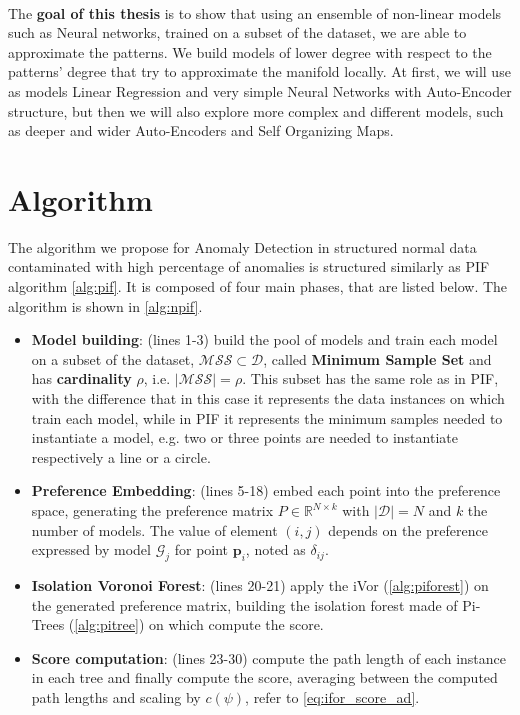 \paragraph{}
The \textbf{goal of this thesis} is to show that using an ensemble of non-linear models such as Neural networks, trained on a subset of the dataset, we are able to approximate the patterns. \newline
We build models of lower degree with respect to the patterns' degree that try to approximate the manifold locally. At first, we will use as models Linear Regression and very simple Neural Networks with Auto-Encoder structure, but then we will also explore more complex and different models, such as deeper and wider Auto-Encoders and Self Organizing Maps.

\section{Algorithm}
\label{sec:algorithm}
The algorithm we propose for Anomaly Detection in structured normal data contaminated with high percentage of anomalies is structured similarly as PIF algorithm \ref{alg:pif}. It is composed of four main phases, that are listed below. The algorithm is shown in \ref{alg:npif}.

\begin{itemize}
    \item \textbf{Model building}: (lines 1-3) build the pool of models and train each model on a subset of the dataset, $\mathcal{MSS} \subset \mathcal{D}$, called \textbf{Minimum Sample Set} and has \textbf{cardinality} $\rho$, i.e. $|\mathcal{MSS}| = \rho$. This subset has the same role as in PIF, with the difference that in this case it represents the data instances on which train each model, while in PIF it represents the minimum samples needed to instantiate a model, e.g. two or three points are needed to instantiate respectively a line or a circle.
    
    \item \textbf{Preference Embedding}: (lines 5-18) embed each point into the preference space, generating the preference matrix $P \in \mathbb{R}^{N \times k}$ with $|\mathcal{D}| = N$ and $k$ the number of models. The value of element $(i, j)$ depends on the preference expressed by model $\mathcal{G}_j$ for point $\textbf{p}_i$, noted as $\delta_{ij}$.
    
    \item \textbf{Isolation Voronoi Forest}: (lines 20-21) apply the iVor (\ref{alg:piforest}) on the generated preference matrix, building the isolation forest made of Pi-Trees (\ref{alg:pitree}) on which compute the score.
    
    \item \textbf{Score computation}: (lines 23-30) compute the path length of each instance in each tree and finally compute the score, averaging between the computed path lengths and scaling by $c(\psi)$, refer to \ref{eq:ifor_score_ad}.
    
\end{itemize}

